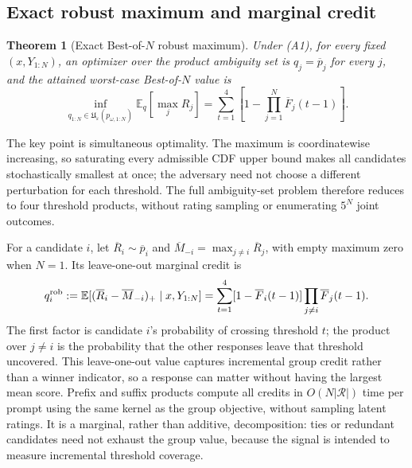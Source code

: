 \documentclass{article}
\newtheorem{theorem}{Theorem}
\theoremstyle{definition}
\theoremstyle{remark}
\begin{document}
\subsection{Exact robust maximum and marginal credit}
\label{subsec:exact-credit}

\begin{theorem}[Exact Best-of-\(N\) robust maximum]
\label{thm:main-max}
Under (A1), for every fixed \((x,Y_{1:N})\), an optimizer over the product
ambiguity set is \(q_j=\overline p_j\) for every \(j\), and the attained
worst-case Best-of-\(N\) value is
\begin{equation}
\label{eq:robust-max-theorem}
\inf_{q_{1:N}\in\mathfrak U_{\varepsilon}(p_{\omega,1:N})}
\mathbb E_q[\max_jR_j]
=\sum_{t=1}^{4}\left[1-\prod_{j=1}^{N}\overline F_j(t-1)\right].
\end{equation}
\end{theorem}

The key point is simultaneous optimality.  The maximum is coordinatewise
increasing, so saturating every admissible CDF upper bound makes all candidates
stochastically smallest at once; the adversary need not choose a different
perturbation for each threshold.  The full ambiguity-set problem therefore
reduces to four threshold products, without rating sampling or enumerating
\(5^N\) joint outcomes.

For a candidate \(i\), let \(\overline R_i\sim\overline p_i\) and
\(\overline M_{-i}=\max_{j\ne i}\overline R_j\), with empty maximum zero
when \(N=1\). Its leave-one-out marginal
credit is
\begin{equation}
\label{eq:robust-credit-closed}
q_i^{\rm rob}:=\mathbb E[(\overline R_i-
\overline M_{-i})_+\mid x,Y_{1:N}]
=\sum_{t=1}^{4}[1-\overline F_i(t-1)]\prod_{j\ne i}\overline F_j(t-1).
\end{equation}
The first factor is candidate \(i\)'s probability of crossing threshold \(t\);
the product over \(j\ne i\) is the probability that the other responses leave
that threshold uncovered.  This leave-one-out value captures incremental group
credit rather than a winner indicator, so a response can matter without having
the largest mean score.  Prefix and suffix products compute all credits in
\(O(N|\mathcal R|)\) time per prompt using the same kernel as the group
objective, without sampling latent ratings. It is a
marginal, rather than additive, decomposition: ties or redundant candidates
need not exhaust the group value, because the signal is intended to measure
incremental threshold coverage.
\end{document}
